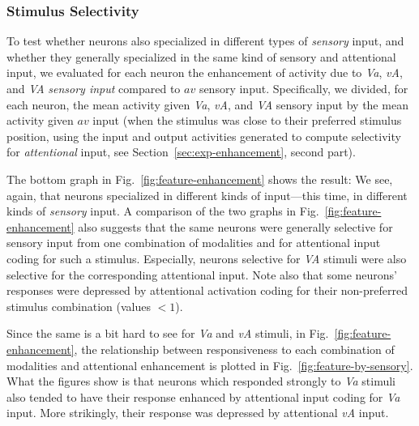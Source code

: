     \subsubsection{Stimulus Selectivity}
        To test whether neurons also specialized in different types of \emph{sensory} input, and whether they generally specialized in the same kind of sensory and attentional input, we evaluated for each neuron the enhancement of activity due to \textit{Va}, \textit{vA}, and \textit{VA} \emph{sensory input} compared to $av$ sensory input.
        Specifically, we divided, for each neuron, the mean activity given \textit{Va}, \textit{vA}, and \textit{VA} sensory input by the mean activity given $av$ input (when the stimulus was close to their preferred stimulus position, using the input and output activities generated to compute selectivity for \emph{attentional} input, see Section~\ref{sec:exp-enhancement}, second part).

        The bottom graph in Fig.~\ref{fig:feature-enhancement} shows the result:
        We see, again, that neurons specialized in different kinds of input---this time, in different kinds of \emph{sensory} input.
        A comparison of the two graphs in Fig.~\ref{fig:feature-enhancement} also suggests that the same neurons were generally selective for sensory input from one combination of modalities and for attentional input coding for such a stimulus.
        Especially, neurons selective for \textit{VA} stimuli were also selective for the corresponding attentional input.
        Note also that some neurons' responses were depressed by attentional activation coding for their non-preferred stimulus combination (values $<1$).

        Since the same is a bit hard to see for \textit{Va} and \textit{vA} stimuli, in Fig.~\ref{fig:feature-enhancement}, the relationship between responsiveness to each combination of modalities and attentional enhancement is plotted in Fig.~\ref{fig:feature-by-sensory}.
        What the figures show is that neurons which responded strongly to \textit{Va} stimuli also tended to have their response enhanced by attentional input coding for \textit{Va} input.
        More strikingly, their response was depressed by attentional \textit{vA} input.
            
